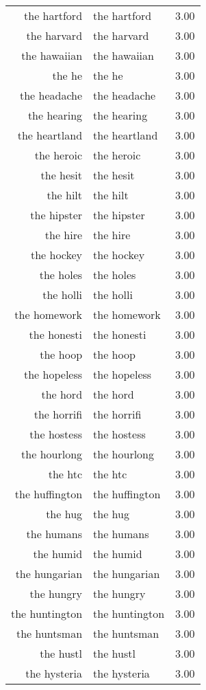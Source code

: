 \begin{table}[ht]
\begin{tabular}{rlr}
  the hartford & the hartford & 3.00 \\ 
  the harvard & the harvard & 3.00 \\ 
  the hawaiian & the hawaiian & 3.00 \\ 
  the he & the he & 3.00 \\ 
  the headache & the headache & 3.00 \\ 
  the hearing & the hearing & 3.00 \\ 
  the heartland & the heartland & 3.00 \\ 
  the heroic & the heroic & 3.00 \\ 
  the hesit & the hesit & 3.00 \\ 
  the hilt & the hilt & 3.00 \\ 
  the hipster & the hipster & 3.00 \\ 
  the hire & the hire & 3.00 \\ 
  the hockey & the hockey & 3.00 \\ 
  the holes & the holes & 3.00 \\ 
  the holli & the holli & 3.00 \\ 
  the homework & the homework & 3.00 \\ 
  the honesti & the honesti & 3.00 \\ 
  the hoop & the hoop & 3.00 \\ 
  the hopeless & the hopeless & 3.00 \\ 
  the hord & the hord & 3.00 \\ 
  the horrifi & the horrifi & 3.00 \\ 
  the hostess & the hostess & 3.00 \\ 
  the hourlong & the hourlong & 3.00 \\ 
  the htc & the htc & 3.00 \\ 
  the huffington & the huffington & 3.00 \\ 
  the hug & the hug & 3.00 \\ 
  the humans & the humans & 3.00 \\ 
  the humid & the humid & 3.00 \\ 
  the hungarian & the hungarian & 3.00 \\ 
  the hungry & the hungry & 3.00 \\ 
  the huntington & the huntington & 3.00 \\ 
  the huntsman & the huntsman & 3.00 \\ 
  the hustl & the hustl & 3.00 \\ 
  the hysteria & the hysteria & 3.00 \\ 

\end{tabular}
\end{table}
